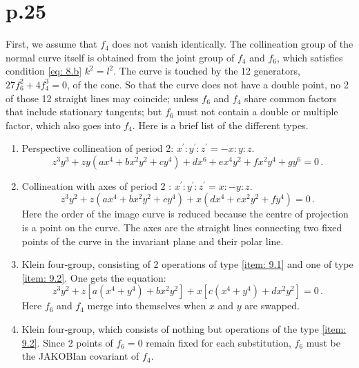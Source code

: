 \documentclass[leqno]{article}
\begin{document}
\section{p.25}
First, we assume that $f_4$ does not vanish identically. The collineation group of the normal curve itself is obtained from the joint group of $f_4$ and $f_6$, which satisfies condition \eqref{eq: 8.b} $k^2=l^2$. The curve is touched by the 12 generators, $27 f_6^2 + 4 f_4^3=0$, of the cone. So that the curve does not have a double point, no 2 of those 12 straight lines may coincide; unless $f_6$ and $f_4$ share common factors that include stationary tangents; but $f_6$ must not contain a double or multiple factor, which also goes into $f_4$. Here is a brief list of the different types. 
\begin{enumerate}[label=\arabic*)]
    \item \label{item: 9.1}Perspective collineation of period 2: $x^\prime : y^\prime : z^\prime = -x : y : z$.
    \begin{equation}\label{eq: 9.1}
        z^3 y^3 + zy (ax^4 + b x^2 y^2 + c y^4) + dx^6 + e x^4 y^2 + f x^2 y^4 + g y^6 = 0 \, . \tag{1}
    \end{equation}
    \item \label{item: 9.2}Collineation \guillemotright with axes\guillemotright{} of period 2 : $x^\prime : y^\prime : z^\prime = x : -y : z$.
    \begin{equation}\label{eq: 9.2}
        z^3 y^2 + z(ax^4 + b x^2 y^2 + c y^4) + x(dx^4 + e x^2 y^2 + f y^4) = 0 \, . \tag{2}
    \end{equation}
    Here the order of the image curve is reduced because the centre of projection is a point on the curve. The axes are the straight lines connecting two fixed points of the curve in the invariant plane and their polar line.
    \item \label{item: 9.3}Klein four-group, consisting of 2 operations of type \ref{item: 9.1} and one of type \ref{item: 9.2}. One gets the equation: 
    \begin{equation}\label{eq: 9.3}
        z^3 y^2 + z[a(x^4 + y^4) + b x^2 y^2] + x[c(x^4 + y^4) + d x^2 y^2] = 0 \, . \tag{3}
    \end{equation}
    Here $f_6$ and $f_4$ merge into themselves when $x$ and $y$ are swapped.
    \item \label{item: 9.4}Klein four-group, which consists of nothing but operations of the type \ref{item: 9.2}. Since 2 points of $f_6=0$ remain fixed for each substitution, $f_6$ must be the JAKOBIan covariant of $f_4$.

\end{enumerate}
\end{document}
